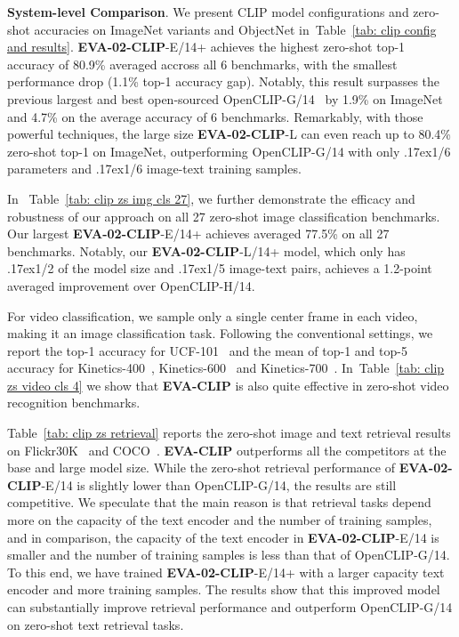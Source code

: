 \documentclass[10pt,twocolumn,letterpaper]{article}
\newcommand{\evablue}[1]{\textcolor{00blue!80}{#1}}
\renewcommand{\paragraph}[1]{\vspace{1.25mm}\noindent\textbf{#1}}
\newcommand{\app}{\raise.17ex\hbox{}}
\newcommand{\tblref}[1]{Table~\ref{#1}}
\newcommand{\evaclip}{{\textbf{\evablue{EVA-CLIP}}}\xspace}
\newcommand{\evaTwoclip}{{\textbf{\evablue{EVA-02-CLIP}}}\xspace}
\begin{document}
\paragraph{System-level Comparison}. We present CLIP model configurations and zero-shot accuracies on ImageNet variants and ObjectNet in~\tblref{tab: clip config and results}. \evaTwoclip-E/14+ achieves the highest zero-shot top-1 accuracy of 80.9\% averaged accross all 6 benchmarks, with the smallest performance drop (1.1\% top-1 accuracy gap). Notably, this result surpasses the previous largest and best open-sourced OpenCLIP-G/14~\cite{clipbigg} by 1.9\% on ImageNet and 4.7\% on the average accuracy of 6 benchmarks. Remarkably, with those powerful techniques, the large size \evaTwoclip-L can even reach up to 80.4\% zero-shot top-1 on ImageNet, outperforming OpenCLIP-G/14 with only \app1/6 parameters and \app1/6 image-text training samples.

In ~\tblref{tab: clip zs img cls 27}, we further demonstrate the efficacy and robustness of our approach on all 27 zero-shot image classification benchmarks. Our largest \evaTwoclip-E/14+ achieves averaged 77.5\% on all 27 benchmarks. Notably, our \evaTwoclip-L/14+ model, which only has \app1/2 of the model size and \app1/5 image-text pairs, achieves a 1.2-point averaged improvement over OpenCLIP-H/14.

For video classification, we sample only a single center frame in each video, making it an image classification task. Following the conventional settings, we report the top-1 accuracy for UCF-101~\cite{ucf101} and the mean of top-1 and top-5 accuracy for Kinetics-400~\cite{carreira2017quo}, Kinetics-600~\cite{k600} and Kinetics-700~\cite{k700}. In~\tblref{tab: clip zs video cls 4} we show that \evaclip is also quite effective in zero-shot video recognition benchmarks. 

\tblref{tab: clip zs retrieval} reports the zero-shot image and text retrieval results on Flickr30K~\cite{flickr30K} and COCO~\cite{lin2014coco}. \evaclip outperforms all the competitors at the base and large model size.  While the zero-shot retrieval performance of \evaTwoclip-E/14 is slightly lower than OpenCLIP-G/14, the results are still competitive. We speculate that the main reason is that retrieval tasks depend more on the capacity of the text encoder and the number of training samples, and in comparison, the capacity of the text encoder in \evaTwoclip-E/14 is smaller and the number of training samples is less than that of OpenCLIP-G/14. To this end, we have trained \evaTwoclip-E/14+ with a larger capacity text encoder and more training samples. The results show that this improved model can substantially improve retrieval performance and outperform OpenCLIP-G/14 on zero-shot text retrieval tasks. 
\end{document}
